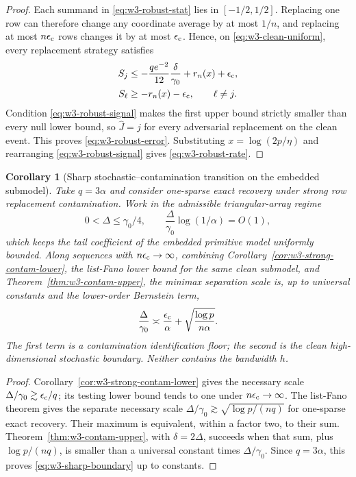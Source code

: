 \documentclass[11pt]{article}
\newtheorem{corollary}[theorem]{Corollary}
\theoremstyle{remark}
\begin{document}
\begin{proof}
Each summand in \eqref{eq:w3-robust-stat} lies in $[-1/2,1/2]$.  Replacing one
row can therefore change any coordinate average by at most $1/n$, and replacing
at most $n\epsilon_{\rm c}$ rows changes it by at most
$\epsilon_{\rm c}$.  Hence, on \eqref{eq:w3-clean-uniform}, every replacement
strategy satisfies
\begin{align}
 S_j
 &\le-\frac{q e^{-2}}{12}\frac{\delta}{\gamma_0}
      +r_n(x)+\epsilon_{\rm c},
 \label{eq:w3-active-after-contam}\\
 S_\ell
 &\ge-r_n(x)-\epsilon_{\rm c},
 \qquad \ell\ne j.
 \label{eq:w3-null-after-contam}
\end{align}
Condition \eqref{eq:w3-robust-signal} makes the first upper bound strictly
smaller than every null lower bound, so $\widehat J=j$ for every adversarial
replacement on the clean event.  This proves \eqref{eq:w3-robust-error}.
Substituting $x=\log(2p/\eta)$ and rearranging
\eqref{eq:w3-robust-signal} gives \eqref{eq:w3-robust-rate}.
\end{proof}

\begin{corollary}[Sharp stochastic--contamination transition on the embedded submodel]
\label{cor:w3-sharp-contam}
Take $q=3\alpha$ and consider one-sparse exact recovery under strong row
replacement contamination.  Work in the admissible triangular-array regime
\begin{equation}
 0<\Delta\le\gamma_0/4,
 \qquad
 \frac{\Delta}{\gamma_0}\log(1/\alpha)=O(1),
 \label{eq:w3-submodel-admissible}
\end{equation}
which keeps the tail coefficient of the embedded primitive model uniformly
bounded.  Along sequences with $n\epsilon_{\rm c}\to\infty$, combining
Corollary~\ref{cor:w3-strong-contam-lower}, the list-Fano lower bound for the
same clean submodel, and Theorem~\ref{thm:w3-contam-upper}, the minimax
separation scale is, up to universal constants and the lower-order Bernstein
term,
\begin{equation}
 \frac{\Delta}{\gamma_0}
 \asymp
 \frac{\epsilon_{\rm c}}{\alpha}
 +\sqrt{\frac{\log p}{n\alpha}}.
 \label{eq:w3-sharp-boundary}
\end{equation}
The first term is a contamination identification floor; the second is the
clean high-dimensional stochastic boundary.  Neither contains the bandwidth
$h$.
\end{corollary}

\begin{proof}
Corollary~\ref{cor:w3-strong-contam-lower} gives the necessary scale
$\Delta/\gamma_0\gtrsim\epsilon_{\rm c}/q$; its testing lower bound tends to one
under $n\epsilon_{\rm c}\to\infty$.  The list-Fano theorem gives the separate
necessary scale
$\Delta/\gamma_0\gtrsim\sqrt{\log p/(nq)}$ for one-sparse exact recovery.
Their maximum is equivalent, within a factor two, to their sum.
Theorem~\ref{thm:w3-contam-upper}, with $\delta=2\Delta$, succeeds when that
sum, plus $\log p/(nq)$, is smaller than a universal constant times
$\Delta/\gamma_0$.  Since $q=3\alpha$, this proves
\eqref{eq:w3-sharp-boundary} up to constants.
\end{proof}
\end{document}
